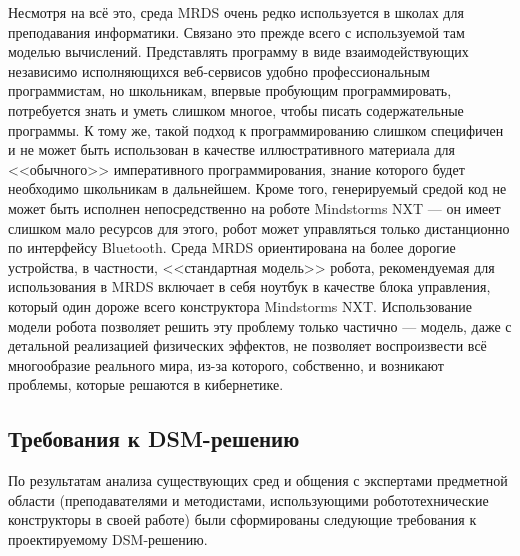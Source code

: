 Несмотря на всё это, среда MRDS очень редко используется в школах для преподавания 
информатики. Связано это прежде всего с используемой там моделью вычислений. Представлять 
программу в виде взаимодействующих независимо исполняющихся веб-сервисов удобно профессиональным 
программистам, но школьникам, впервые пробующим программировать, потребуется знать и 
уметь слишком многое, чтобы писать содержательные программы. К тому же, такой подход к 
программированию слишком специфичен и не может быть использован в качестве иллюстративного 
материала для <<обычного>> императивного программирования, знание которого будет необходимо 
школьникам в дальнейшем. Кроме того, генерируемый средой код не может быть исполнен 
непосредственно на роботе Mindstorms NXT --- он имеет слишком мало ресурсов для этого, 
робот может управляться только дистанционно по интерфейсу Bluetooth. Среда MRDS ориентирована 
на более дорогие устройства, в частности, <<стандартная модель>> робота, рекомендуемая 
для использования в MRDS включает в себя ноутбук в качестве блока управления, который 
один дороже всего конструктора Mindstorms NXT. Использование модели робота позволяет 
решить эту проблему только частично --- модель, даже с детальной реализацией физических 
эффектов, не позволяет воспроизвести всё многообразие реального мира, из-за которого, 
собственно, и возникают проблемы, которые решаются в кибернетике.

\subsection{Требования к DSM-решению}
По результатам анализа существующих сред и общения с экспертами предметной области 
(преподавателями и методистами, использующими робототехнические конструкторы в своей работе) 
были сформированы следующие требования к проектируемому \ac{DSM}-решению.

